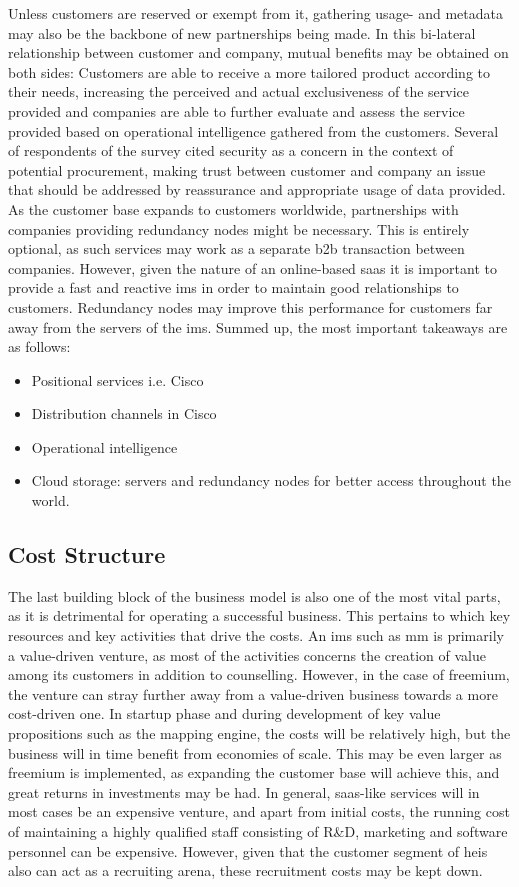 Unless customers are reserved or exempt from it, gathering usage- and metadata may also be the backbone of new partnerships being made. In this bi-lateral relationship between customer and company, mutual benefits may be obtained on both sides: Customers are able to receive a more tailored product according to their needs, increasing the perceived and actual exclusiveness of the service provided and companies are able to further evaluate and assess the service provided based on operational intelligence gathered from the customers. Several of respondents of the survey cited security as a concern in the context of potential procurement, making trust between customer and company an issue that should be addressed by reassurance and appropriate usage of data provided. As the customer base expands to customers worldwide, partnerships with companies providing redundancy nodes might be necessary. This is entirely optional, as such services may work as a separate \gls{b2b} transaction between companies. However, given the nature of an online-based \gls{saas} it is important to provide a fast and reactive \gls{ims} in order to maintain good relationships to customers. Redundancy nodes may improve this performance for customers far away from the servers of the \gls{ims}. Summed up, the most important takeaways are as follows: 


\begin{itemize}
    \item Positional services i.e. Cisco
    \item Distribution channels in Cisco
    \item Operational intelligence
    \item Cloud storage: servers and redundancy nodes for better access throughout the world.
\end{itemize}

\subsection{Cost Structure}
The last building block of the business model is also one of the most vital parts, as it is detrimental for operating a successful business. This pertains to which key resources and key activities that drive the costs. An \gls{ims} such as \gls{mm} is primarily a value-driven venture, as most of the activities concerns the creation of value among its customers in addition to counselling. However, in the case of freemium, the venture can stray further away from a value-driven business towards a more cost-driven one. In startup phase and during development of key value propositions such as the mapping engine, the costs will be relatively high, but the business will in time benefit from economies of scale. This may be even larger as freemium is implemented, as expanding the customer base will achieve this, and great returns in investments may be had. In general, \gls{saas}-like services will in most cases be an expensive venture, and apart from initial costs, the running cost of maintaining a highly qualified staff consisting of R\&D, marketing and software personnel can be expensive. However, given that the customer segment of \glspl{hei} also can act as a recruiting arena, these recruitment costs may be kept down.  


